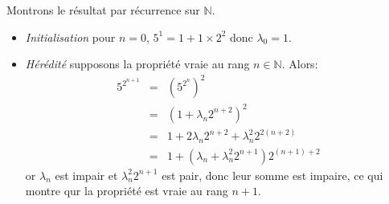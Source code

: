 Montrons le résultat par récurrence sur $\mathbb{N}$.
\begin{itemize}
  \item \textit{Initialisation} pour $n=0$, $5^1=1+1\times 2^2$ donc $\lambda_0=1$.
  \item \textit{Hérédité} supposons la propriété vraie au rang $n\in\mathbb{N}$. Alors:
  \begin{eqnarray*}
    5^{2^{n+1}} &=& \left(5^{2^n}\right)^2 \\
    &=& \left(1+\lambda_n2^{n+2}\right)^2 \\
    &=& 1 + 2\lambda_n 2^{n+2} + \lambda_n^2 2^{2(n+2)} \\
    &=& 1 + \left( \lambda_n + \lambda_n^2 2^{n+1} \right)  2^{(n+1)+2}
  \end{eqnarray*}
  or $ \lambda_n $ est impair et $\lambda_n^2 2^{n+1}$ est pair, donc leur somme est impaire, ce qui montre qur la propriété est vraie au rang $n+1$.
\end{itemize}

